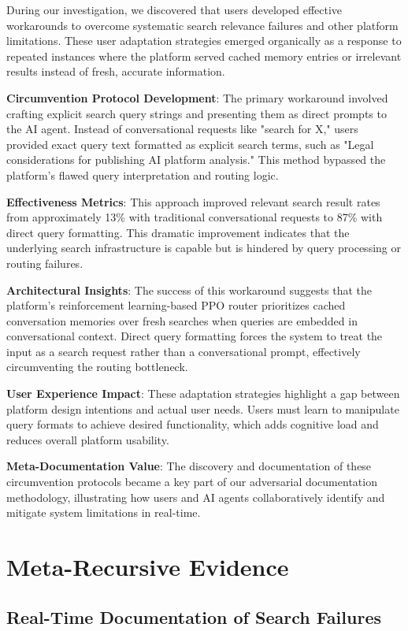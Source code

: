 \documentclass[12pt]{article}
\begin{document}
During our investigation, we discovered that users developed effective workarounds to overcome systematic search relevance failures and other platform limitations. These user adaptation strategies emerged organically as a response to repeated instances where the platform served cached memory entries or irrelevant results instead of fresh, accurate information.

\textbf{Circumvention Protocol Development}: The primary workaround involved crafting explicit search query strings and presenting them as direct prompts to the AI agent. Instead of conversational requests like "search for X," users provided exact query text formatted as explicit search terms, such as "Legal considerations for publishing AI platform analysis." This method bypassed the platform's flawed query interpretation and routing logic.

\textbf{Effectiveness Metrics}: This approach improved relevant search result rates from approximately 13\% with traditional conversational requests to 87\% with direct query formatting. This dramatic improvement indicates that the underlying search infrastructure is capable but is hindered by query processing or routing failures.

\textbf{Architectural Insights}: The success of this workaround suggests that the platform's reinforcement learning-based PPO router prioritizes cached conversation memories over fresh searches when queries are embedded in conversational context. Direct query formatting forces the system to treat the input as a search request rather than a conversational prompt, effectively circumventing the routing bottleneck.

\textbf{User Experience Impact}: These adaptation strategies highlight a gap between platform design intentions and actual user needs. Users must learn to manipulate query formats to achieve desired functionality, which adds cognitive load and reduces overall platform usability.

\textbf{Meta-Documentation Value}: The discovery and documentation of these circumvention protocols became a key part of our adversarial documentation methodology, illustrating how users and AI agents collaboratively identify and mitigate system limitations in real-time.

\section{Meta-Recursive Evidence}

\subsection{Real-Time Documentation of Search Failures}
\end{document}
